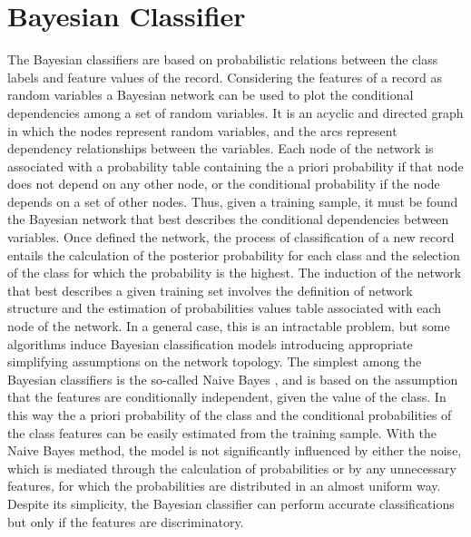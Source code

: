 \section{Bayesian Classifier} \label{NB}
The Bayesian classifiers are based on probabilistic relations between the class labels and feature values of the record. Considering the features of a record as random variables a Bayesian network can be used to plot the conditional dependencies among a set of random variables. It is an acyclic and directed graph in which the nodes represent random variables, and the arcs represent dependency relationships between the variables. Each node of the network is associated with a probability table containing the a priori probability if that node does not depend on any other node, or the conditional probability if the node depends on a set of other nodes. Thus, given a training sample, it must be found the Bayesian network that best describes the conditional dependencies between variables. Once defined the network, the process of classification of a new record entails the calculation of the posterior probability for each class and the selection of the class for which the probability is the highest. The induction of the network that best describes a given training set involves the definition of network structure and the estimation of probabilities values table associated with each node of the network. In a general case, this is an intractable problem, but some algorithms induce Bayesian classification models introducing appropriate simplifying assumptions on the network topology. The simplest among the Bayesian classifiers is the so-called Naive Bayes  \cite{Duda}, \cite{Langley} and is based on the assumption that the features are conditionally independent, given the value of the class. In this way the a priori probability of the class and the conditional probabilities of the class features can be easily estimated from the training sample. With the Naive Bayes method, the model is not significantly influenced by either the noise, which is mediated through the calculation of probabilities or by any unnecessary features, for which the probabilities are distributed in an almost uniform way. Despite its simplicity, the Bayesian classifier can perform accurate classifications but only if the features are discriminatory.

